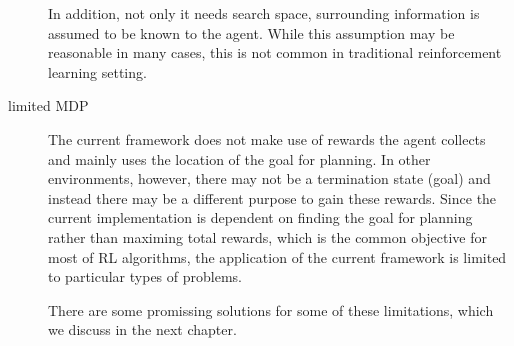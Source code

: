 \begin{description}
In addition, not only it needs search space, surrounding information is assumed to be known to the agent. 
While this assumption may be reasonable in many cases, this is not common in traditional reinforcement learning setting.

\item[limited MDP]
The current framework does not make use of rewards the agent collects and mainly uses the location of the goal for planning.
In other environments, however, there may not be a termination state (goal) and instead there may be a different purpose to gain these rewards. 
Since the current implementation is dependent on finding the goal for planning rather than maximing total rewards, 
which is the common objective for most of RL algorithms,
the application of the current framework is limited to particular types of problems.

There are some promissing solutions for some of these limitations, which we discuss in the next chapter.

\end{description}  

